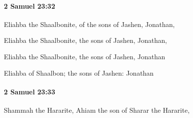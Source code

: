 		\paragraph{2 Samuel 23:32} %
			\label{2SAMUEL-23-32}

			Eliahba the Shaalbonite, of the sons of Jashen, Jonathan,

			\begin{versebox}
					\item[BHS] 
					\item[ASV] Eliahba the Shaalbonite, the sons of Jashen, Jonathan,
					\item[NIV] Eliahba the Shaalbonite, the sons of Jashen, Jonathan
					\item[NRSV] Eliahba of Shaalbon; the sons of Jashen: Jonathan
			\end{versebox}

		\paragraph{2 Samuel 23:33} %
			\label{2SAMUEL-23-33}

			Shammah the Hararite, Ahiam the son of Sharar the Hararite,

